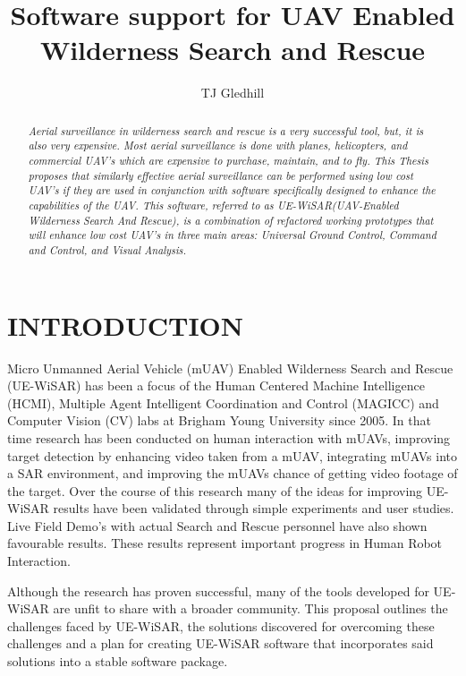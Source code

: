 \documentclass[12pt]{IEEEtran}
\title{Software support for UAV Enabled Wilderness Search and Rescue}
\author{TJ Gledhill}
\begin{document}
\maketitle

\begin{abstract}
\textit{Aerial surveillance in wilderness search and rescue is a very successful
tool, but, it is also very expensive.
Most aerial surveillance is done with planes, helicopters, and commercial UAV’s which are expensive to purchase, maintain, and to fly.  
This Thesis proposes that similarly effective aerial surveillance can be
performed using low cost UAV’s if they are used in conjunction with software specifically designed to enhance the capabilities of the UAV.
This software, referred to as UE-WiSAR(UAV-Enabled Wilderness Search And
Rescue), is a combination of refactored working prototypes that will
enhance low cost UAV’s in three main areas:
Universal Ground Control, Command and Control, and Visual Analysis.}
\end{abstract}

\section{INTRODUCTION}
Micro Unmanned Aerial Vehicle (mUAV) Enabled Wilderness Search and Rescue
(UE-WiSAR) has been a focus of the Human Centered Machine Intelligence (HCMI),
Multiple Agent Intelligent Coordination and Control (MAGICC) and Computer Vision
(CV) labs at Brigham Young University since 2005.  In that time research has
been conducted on human interaction with mUAVs, improving target detection by
enhancing video taken from a mUAV, integrating mUAVs into a SAR environment,
and improving the mUAVs chance of getting video footage of the target.  Over
the course of this research many of the ideas for improving UE-WiSAR results
have been validated through simple experiments and user studies.  Live Field
Demo's with actual Search and Rescue personnel have also shown favourable
results. These results represent important progress in Human Robot Interaction. 

Although the research has proven successful, many of the tools developed for
UE-WiSAR are unfit to share with a broader community.  This proposal outlines
the challenges faced by UE-WiSAR, the solutions discovered for overcoming these
challenges and a plan for creating UE-WiSAR software that incorporates said
solutions into a stable software package.

\end{document}
